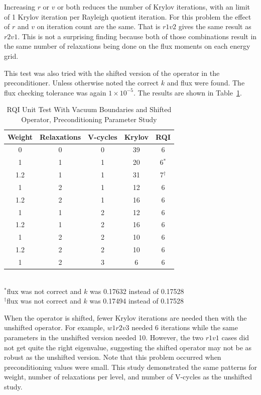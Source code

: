 Increasing $r$ or $v$ or both reduces the number of Krylov iterations, with an limit of 1 Krylov iteration per Rayleigh quotient iteration. For this problem the effect of $r$ and $v$ on iteration count are the same. That is $r1v2$ gives the same result as $r2v1$. This is not a surprising finding because both of those combinations result in the same number of relaxations being done on the flux moments on each energy grid.

This test was also tried with the shifted version of the operator in the preconditioner. Unless otherwise noted the correct $k$ and flux were found. The flux checking tolerance was again $1 \times 10^{-5}$. The results are shown in Table~\ref{table:RQIUnitTestVacShifted}.
%
\begin{table}[!h]
\caption{RQI Unit Test With Vacuum Boundaries and Shifted Operator, Preconditioning Parameter Study}
\begin{center}
\begin{tabular}{c c c c c}
\hline
Weight & Relaxations & V-cycles & Krylov & RQI \\[0.5ex]
\hline
0    & 0 & 0 & 39 & 6 \\
1    & 1 & 1 & 20 & 6$^{*}$ \\
1.2 & 1 & 1 & 31 & 7$^{\dagger}$ \\
1    & 2 & 1 & 12 & 6 \\
1.2 & 2 & 1 & 16 & 6 \\
1    & 1 & 2 & 12 & 6 \\
1.2 & 1 & 2 & 16 & 6 \\
1    & 2 & 2 & 10 & 6 \\
1.2 & 2 & 2 & 10 & 6 \\
1    & 2 & 3 & 6   & 6 \\
\hline 
\end{tabular}\\
$^{*}$flux was not correct and $k$ was 0.17632 instead of 0.17528 \\
 $^{\dagger}$flux was not correct and $k$ was 0.17494 instead of 0.17528
\end{center}
\label{table:RQIUnitTestVacShifted}
\end{table}

When the operator is shifted, fewer Krylov iterations are needed then with the unshifted operator. For example, $w1r2v3$ needed 6 iterations while the same parameters in the unshifted version needed 10. However, the two $r1v1$ cases did not get quite the right eigenvalue, suggesting the shifted operator may not be as robust as the unshifted version. Note that this problem occurred when preconditioning values were small. This study demonstrated the same patterns for weight, number of relaxations per level, and number of V-cycles as the unshifted study. 

